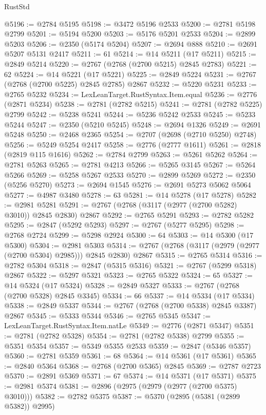 \begin{lexlean}{RustStd}
\begin{coremodule}
@5196 := @2784 @5195
@5198 := @3472 @5196 @2533
@5200 := @2781 @5198 @2799
@5201 := @5194 @5200
@5203 := @5176 @5201 @2533
@5204 := @2899 @5203
@5206 := @2350 (@5174 @5204)
@5207 := @2694 @888
@5210 := @2691 @5207 @5131 @2417
@5211 := 61
@5214 := @14 @5211 (@17 @5211)
@5215 := @2849 @5214
@5220 := @2767 (@2768 (@2700 @5215) @2845 @2783)
@5221 := 62
@5224 := @14 @5221 (@17 @5221)
@5225 := @2849 @5224
@5231 := @2767 (@2768 (@2700 @5225) @2845 @2785) @2867
@5232 := @5220 @5231
@5233 := @2765 @5232
@5234 := LexLeanTarget.RustSyntax.Item.equal
@5236 := @2776 (@2871 @5234)
@5238 := @2781 (@2782 @5215)
@5241 := @2781 (@2782 @5225) @2799
@5242 := @5238 @5241
@5244 := @5236 @5242 @2533
@5245 := @5233 @5244
@5247 := @2350 (@5210 @5245)
@5248 := @2694 @1326
@5249 := @2691 @5248
@5250 := @2468 @2365
@5254 := @2707 (@2698 (@2710 @5250) @2748)
@5256 := @5249 @5254 @2417
@5258 := @2776 (@2777 @1611)
@5261 := @2818 (@2819 @115 @1616)
@5262 := @2784 @2799
@5263 := @5261 @5262
@5264 := @2781 @5263
@5265 := @2781 @4213
@5266 := @5265 @3145
@5267 := @5264 @5266
@5269 := @5258 @5267 @2533
@5270 := @2899 @5269
@5272 := @2350 (@5256 @5270)
@5273 := @2694 @1545
@5276 := @2691 @5273 @5062 @5064
@5277 := @4987 @3480
@5278 := 63
@5281 := @14 @5278 (@17 @5278)
@5282 := @2981 @5281
@5291 := @2767 (@2768 (@3117 (@2977 (@2700 @5282) @3010)) @2845 @2830) @2867
@5292 := @2765 @5291
@5293 := @2782 @5282
@5295 := @2847 (@5292 @5293)
@5297 := @2767 (@5277 @5295)
@5298 := @2768 @2724
@5299 := @5298 @2924
@5300 := 64
@5303 := @14 @5300 (@17 @5300)
@5304 := @2981 @5303
@5314 := @2767 (@2768 (@3117 (@2979 (@2977 (@2700 @5304) @2985))) @2845 @2830) @2867
@5315 := @2765 @5314
@5316 := @2782 @5304
@5318 := @2847 (@5315 @5316)
@5321 := @2767 (@5299 @5318) @2867
@5322 := @5297 @5321
@5323 := @2765 @5322
@5324 := 65
@5327 := @14 @5324 (@17 @5324)
@5328 := @2849 @5327
@5333 := @2767 (@2768 (@2700 @5328) @2845 @3345)
@5334 := 66
@5337 := @14 @5334 (@17 @5334)
@5338 := @2849 @5337
@5344 := @2767 (@2768 (@2700 @5338) @2845 @3387) @2867
@5345 := @5333 @5344
@5346 := @2765 @5345
@5347 := LexLeanTarget.RustSyntax.Item.natLe
@5349 := @2776 (@2871 @5347)
@5351 := @2781 (@2782 @5328)
@5354 := @2781 (@2782 @5338) @2799
@5355 := @5351 @5354
@5357 := @5349 @5355 @2533
@5359 := @2847 (@5346 @5357)
@5360 := @2781 @5359
@5361 := 68
@5364 := @14 @5361 (@17 @5361)
@5365 := @2840 @5364
@5368 := @2768 (@2700 @5365) @2845
@5369 := @2787 @2723
@5370 := @2891 @5369
@5371 := 67
@5374 := @14 @5371 (@17 @5371)
@5375 := @2981 @5374
@5381 := @2896 (@2975 (@2979 (@2977 (@2700 @5375) @3010)))
@5382 := @2782 @5375
@5387 := @5370 (@2895 (@5381 (@2899 @5382)) @2995)

\end{coremodule}
\end{lexlean}
